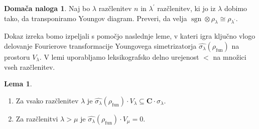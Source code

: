 \documentclass[11pt]{book}
\def\CC{\mathbf{C}}
\def\youngsym{\sigma_{\lambda}}
\DeclareMathOperator\sgn{sgn}
\DeclareMathOperator\fun{fun}
\theoremstyle{definition}
\theoremstyle{zgled}
\theoremstyle{odprtproblem}
\theoremstyle{domacanaloga}
\newtheorem*{domacanaloga}{Domača naloga}
\theoremstyle{izrek}
\newtheorem*{lema}{Lema}
\begin{document}
\begin{domacanaloga}
    Naj bo $\lambda$ razčlenitev $n$ in $\lambda^\prime$ razčlenitev, ki jo iz $\lambda$ dobimo tako, da transponiramo Youngov diagram. Preveri, da velja $\sgn \otimes \rho_{\lambda} \cong \rho_{\lambda^\prime}$.
\end{domacanaloga}        

Dokaz izreka bomo izpeljali s pomočjo naslednje leme, v kateri igra ključno vlogo delovanje Fourierove transformacije Youngovega simetrizatorja $\widehat{\youngsym}(\rho_{\fun})$ na prostoru $V_{\lambda}$. V lemi uporabljamo leksikografsko delno urejenost $<$ na množici vseh razčlenitev. 

\begin{lema} \leavevmode
\begin{enumerate}
    \item Za vsako razčlenitev $\lambda$ je $\widehat{\youngsym}(\rho_{\fun}) \cdot V_{\lambda} \subseteq \CC \cdot \youngsym$.
    \item Za razčlenitvi $\lambda > \mu$ je $\widehat{\youngsym}(\rho_{\fun}) \cdot V_{\mu} = 0$.
\end{enumerate}
\end{lema}
\end{document}
